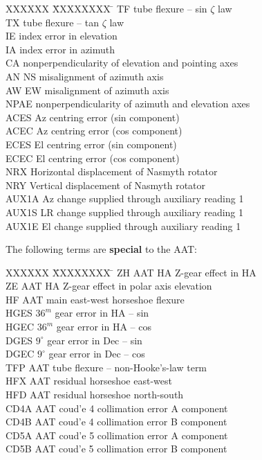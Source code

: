 \begin{tabs}
XXXXXX \= XXXXXXXX \= \kill
\> TF   \> tube flexure -- sin $\zeta$ law \\
\> TX   \> tube flexure -- tan $\zeta$ law \\
\> IE   \> index error in elevation \\
\> IA   \> index error in azimuth \\
\> CA   \> nonperpendicularity of elevation and pointing axes \\
\> AN   \> NS misalignment of azimuth axis \\
\> AW   \> EW misalignment of azimuth axis \\
\> NPAE \> nonperpendicularity of azimuth and elevation axes \\
\> ACES \> Az centring error (sin component) \\
\> ACEC \> Az centring error (cos component) \\
\> ECES \> El centring error (sin component) \\
\> ECEC \> El centring error (cos component) \\
\> NRX  \> Horizontal displacement of Nasmyth rotator \\
\> NRY  \> Vertical displacement of Nasmyth rotator \\
\> AUX1A \> Az change supplied through auxiliary reading 1 \\
\> AUX1S \> LR change supplied through auxiliary reading 1 \\
\> AUX1E \> El change supplied through auxiliary reading 1
\end{tabs}
The following terms are {\bf special} to the AAT:
\begin{tabs}
XXXXXX \= XXXXXXXX \= \kill
\> ZH   \> AAT HA Z-gear effect in HA \\
\> ZE   \> AAT HA Z-gear effect in polar axis elevation \\
\> HF   \> AAT main east-west horseshoe flexure \\
\> HGES \> $36^{m}$ gear error in HA -- sin \\
\> HGEC \> $36^{m}$ gear error in HA -- cos \\
\> DGES \> $9^{\circ}$ gear error in Dec -- sin \\
\> DGEC \> $9^{\circ}$ gear error in Dec -- cos \\
\> TFP  \> AAT tube flexure -- non-Hooke's-law term \\
\> HFX  \> AAT residual horseshoe east-west \\
\> HFD  \> AAT residual horseshoe north-south \\
\> CD4A \> AAT coud\a'e 4 collimation error A component \\
\> CD4B \> AAT coud\a'e 4 collimation error B component \\
\> CD5A \> AAT coud\a'e 5 collimation error A component \\
\> CD5B \> AAT coud\a'e 5 collimation error B component
\end{tabs}
